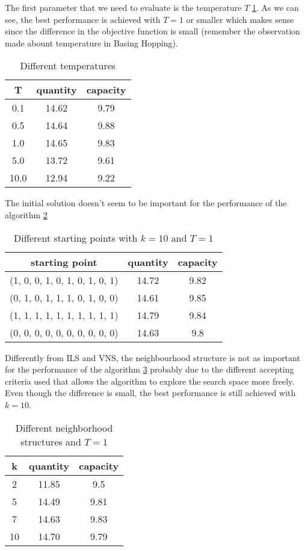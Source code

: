 The first parameter that we need to evaluate is the temperature $T$ \ref{tab:sa-temp}. As we can see, the best performance is achieved with $T=1$ or smaller which makes sense since the difference in the objective function is small (remember the observation made abount temperature in Basing Hopping).
\begin{table}[H]
    \centering
    \begin{tabular}{c||c |c}
        T    & quantity & capacity \\ \hline
        0.1  & 14.62    & 9.79     \\
        0.5  & 14.64    & 9.88     \\
        1.0  & 14.65    & 9.83     \\
        5.0  & 13.72    & 9.61     \\
        10.0 & 12.94    & 9.22     \\
    \end{tabular}
    \caption{Different temperatures}
    \label{tab:sa-temp}
\end{table}

The initial solution doesn't seem to be important for the performance of the algorithm \ref{tab:sa-start}
\begin{table}[H]
    \centering
    \begin{tabular}{c||c |c}
        starting point                 & quantity & capacity \\ \hline
        (1, 0, 0, 1, 0, 1, 0, 1, 0, 1) & 14.72    & 9.82     \\
        (0, 1, 0, 1, 1, 1, 0, 1, 0, 0) & 14.61    & 9.85     \\
        (1, 1, 1, 1, 1, 1, 1, 1, 1, 1) & 14.79    & 9.84     \\
        (0, 0, 0, 0, 0, 0, 0, 0, 0, 0) & 14.63    & 9.8      \\
    \end{tabular}
    \caption{Different starting points with $k=10$ and $T=1$}
    \label{tab:sa-start}
\end{table}

Differently from ILS and VNS, the neighbourhood structure is not as important for the performance of the algorithm \ref{tab:sa-neigh} probably due to the different accepting criteria used that allows the algorithm to explore the search space more freely. Even though the difference is small, the best performance is still achieved with $k=10$.
\begin{table}[H]
    \centering
    \begin{tabular}{c||c |c}
        k  & quantity & capacity \\ \hline
        2  & 11.85    & 9.5      \\
        5  & 14.49    & 9.81     \\
        7  & 14.63    & 9.83     \\
        10 & 14.70     & 9.79     \\
    \end{tabular}
    \caption{Different neighborhood structures and $T=1$}
    \label{tab:sa-neigh}
\end{table}


